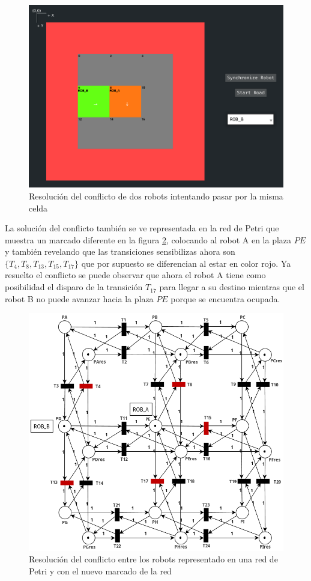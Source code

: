 \begin{figure}[H]
    \centering
    \includegraphics[trim={1.6cm 0.3cm 0 1.5cm}, clip, width=0.7\linewidth]{images/conflicto_map_solucionado.png}
    \caption{Resolución del conflicto de dos robots intentando pasar por la misma celda}
    \label{fig:conflicto_map_solucionado}
\end{figure}

La solución del conflicto también se ve representada en la red de Petri que muestra un marcado diferente en la figura \ref{fig:rdp_no_grid_conflicto_solucionado}, colocando al robot A en la plaza $PE$ y también revelando que las transiciones sensibilizas ahora son $\{T_4, T_8, T_{13}, T_{15}, T_{17}\}$ que por supuesto se diferencian al estar en color rojo. Ya resuelto el conflicto se puede observar que ahora el robot A tiene como posibilidad el disparo de la transición $T_{17}$ para llegar a su destino mientras que el robot B no puede avanzar hacia la plaza $PE$ porque se encuentra ocupada.

\begin{figure}[H]
    \centering
    \includegraphics[width=0.8\linewidth]{images/rdp_no_grid_conflicto_solucionado.png}
    \caption{Resolución del conflicto entre los robots representado en una red de Petri y con el nuevo marcado de la red}
    \label{fig:rdp_no_grid_conflicto_solucionado}
\end{figure}

